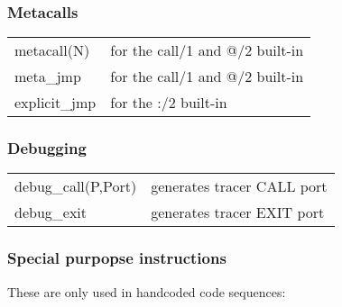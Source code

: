\subsubsection{Metacalls}

\begin{tabular}{|l|l|}
\hline
metacall(N)     & for the call/1 and @/2 built-in                 \\
meta_jmp        & for the call/1 and @/2 built-in                 \\
explicit_jmp    & for the :/2 built-in    \\
\hline
\end{tabular}

\subsubsection{Debugging}

\begin{tabular}{|l|l|}
\hline
debug_call(P,Port)      & generates tracer CALL port      \\
debug_exit              & generates tracer EXIT port      \\
\hline
\end{tabular}

\subsubsection{Special purpopse instructions}
These are only used in handcoded code sequences:

